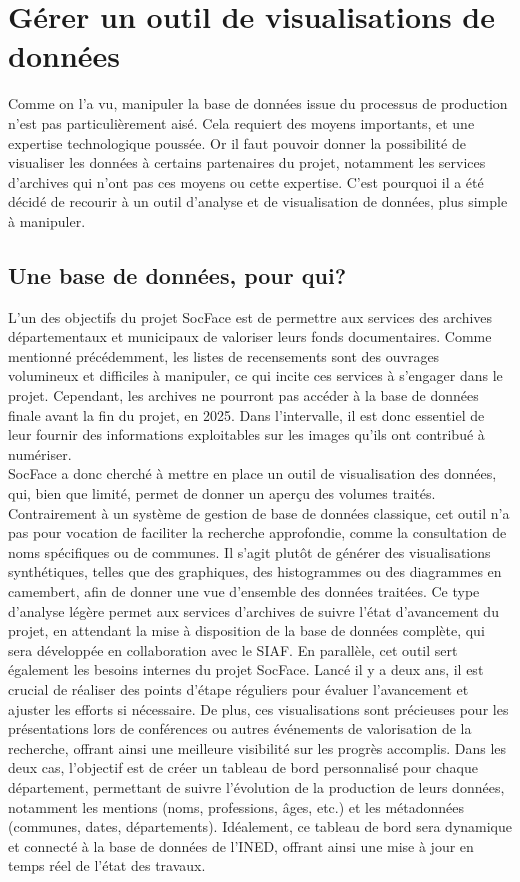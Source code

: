 \chapter{Gérer un outil de visualisations de données}

Comme on l’a vu, manipuler la base de données issue du processus de production n’est pas particulièrement aisé. Cela requiert des moyens importants, et une expertise technologique poussée. Or il faut pouvoir donner la possibilité de visualiser les données à certains partenaires du projet, notamment les services d’archives qui n’ont pas ces moyens ou cette expertise. C’est pourquoi il a été décidé de recourir à un outil d’analyse et de visualisation de données, plus simple à manipuler. 

\section{Une base de données, pour qui?}

L’un des objectifs du projet SocFace est de permettre aux services des archives départementaux et municipaux de valoriser leurs fonds documentaires. Comme mentionné précédemment, les listes de recensements sont des ouvrages volumineux et difficiles à manipuler, ce qui incite ces services à s'engager dans le projet. Cependant, les archives ne pourront pas accéder à la base de données finale avant la fin du projet, en 2025. Dans l'intervalle, il est donc essentiel de leur fournir des informations exploitables sur les images qu’ils ont contribué à numériser.\\
SocFace a donc cherché à mettre en place un outil de visualisation des données, qui, bien que limité, permet de donner un aperçu des volumes traités. Contrairement à un système de gestion de base de données classique, cet outil n’a pas pour vocation de faciliter la recherche approfondie, comme la consultation de noms spécifiques ou de communes. Il s'agit plutôt de générer des visualisations synthétiques, telles que des graphiques, des histogrammes ou des diagrammes en camembert, afin de donner une vue d'ensemble des données traitées. Ce type d’analyse légère permet aux services d'archives de suivre l'état d'avancement du projet, en attendant la mise à disposition de la base de données complète, qui sera développée en collaboration avec le SIAF. En parallèle, cet outil sert également les besoins internes du projet SocFace. Lancé il y a deux ans, il est crucial de réaliser des points d’étape réguliers pour évaluer l’avancement et ajuster les efforts si nécessaire. De plus, ces visualisations sont précieuses pour les présentations lors de conférences ou autres événements de valorisation de la recherche, offrant ainsi une meilleure visibilité sur les progrès accomplis. Dans les deux cas, l’objectif est de créer un tableau de bord personnalisé pour chaque département, permettant de suivre l'évolution de la production de leurs données, notamment les mentions (noms, professions, âges, etc.) et les métadonnées (communes, dates, départements). Idéalement, ce tableau de bord sera dynamique et connecté à la base de données de l’INED, offrant ainsi une mise à jour en temps réel de l’état des travaux.

